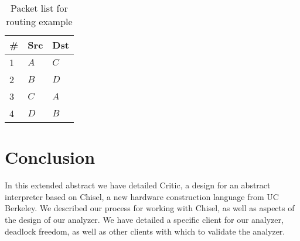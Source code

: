 \documentclass[10pt,conference]{IEEEtran}
\begin{document}
\begin{table}
\begin{center}
\small
\begin{tabular}{|l|l|l|}
\hline
\# & Src & Dst \\ \hline
1 & $A$ & $C$ \\ \hline
2 & $B$ & $D$ \\ \hline
3 & $C$ & $A$ \\ \hline
4 & $D$ & $B$ \\ \hline
\end{tabular}
\end{center}
\caption{Packet list for routing example}
\label{tab:packets}
\end{table}

\section{Conclusion}

In this extended abstract we have detailed Critic, a design for an abstract interpreter
based on Chisel, a new hardware construction language from UC Berkeley. We described
our process for working with Chisel, as well as aspects of the design of our analyzer.
We have detailed a specific client for our analyzer, deadlock freedom, as well as other
clients with which to validate the analyzer.





%
%
%






\end{document}
